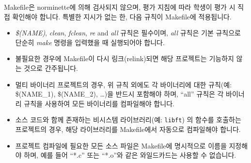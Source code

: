\documentclass{42-ko}
\begin{document}
            Makefile은 norminette에 의해 검사되지 않으며, 평가 지침에 따라 
            학생이 평가 시 직접 확인해야 합니다. 특별한 지시가 없는 한, 다음 
            규칙이 Makefile에 적용됩니다.
            \begin{itemize}

                \item \textit{\$(NAME)}, \textit{clean}, \textit{fclean}, 
                  \textit{re} and \textit{all} 규칙은 필수이며, \textit{all} 
                  규칙은 기본 규칙으로 단순히 \textit{make} 명령을 입력했을 때 
                  실행되어야 합니다.

                \item 불필요한 경우에 Makefile이 다시 링크(relink)되면 해당 
                  프로젝트는 기능하지 않는 것으로 간주됩니다.

                \item 멀티 바이너리 프로젝트의 경우, 위 규칙 외에도 각 바이너리에 
                  대한 규칙(예: \$(NAME\_1), \$(NAME\_2), …)을 반드시 포함해야 
                  하며, ``all'' 규칙은 각 바이너리 규칙을 사용하여 모든 바이너리를 
                  컴파일해야 합니다.

                  \item 소스 코드와 함께 존재하는 비시스템 라이브러리(예: \texttt{libft}) 의 
                    함수를 호출하는 프로젝트의 경우, 해당 라이브러리를 Makefile에서 
                    자동으로 컴파일해야 합니다.

                  \item 프로젝트 컴파일에 필요한 모든 소스 파일은 Makefile에 
                    명시적으로 이름을 지정해야 하며, 예를 들어 ``*.c'' 또는 
                    ``*.o''와 같은 와일드카드는 사용할 수 없습니다.

            \end{itemize}
\end{document}
